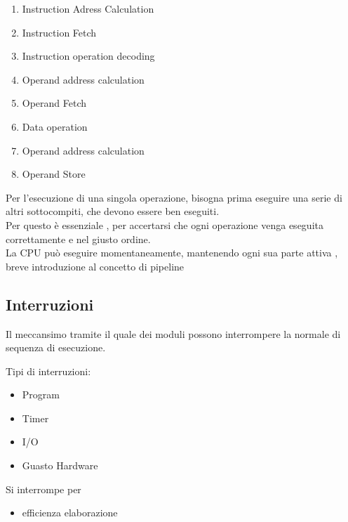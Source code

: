 \documentclass[12pt, a4paper]{article}
\begin{document}
\begin{enumerate}
	\item Instruction Adress Calculation
	\item Instruction Fetch
	\item Instruction operation decoding
	\item Operand address calculation
	\item Operand Fetch
	\item Data operation
	\item Operand address calculation 
	\item Operand Store
\end{enumerate}
Per l'esecuzione di una singola operazione, bisogna prima eseguire una serie
di altri sottocompiti, che devono essere ben eseguiti. \\
Per questo è essenziale , per accertarsi che
ogni operazione venga eseguita correttamente e nel giusto ordine.\\
La CPU può eseguire  momentaneamente, mantenendo ogni sua parte attiva
, breve introduzione al concetto di pipeline


\subsection{Interruzioni}
Il meccansimo tramite il quale dei moduli possono interrompere la normale di sequenza di esecuzione. \newline

Tipi di interruzioni:
\begin{itemize}
	\item Program
	\item Timer
	\item I/O
	\item Guasto Hardware
	\end{itemize}
Si interrompe per
\begin{itemize}
	\item efficienza elaborazione
\end{itemize}
\end{document}
